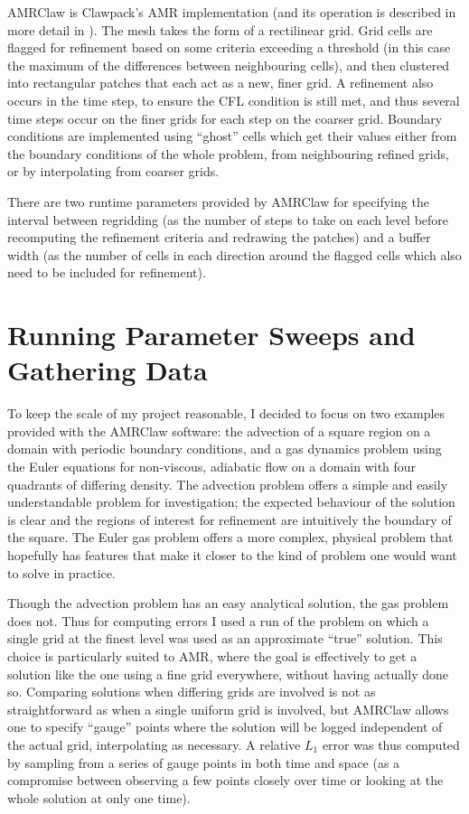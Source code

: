 \documentclass[11pt]{article}
\begin{document}
AMRClaw is Clawpack's AMR implementation (and its operation is described
in more detail in \cite{BergerLeVeque98}). The mesh takes the form of a 
rectilinear grid. Grid cells are flagged for refinement based on some criteria
exceeding a threshold (in this case the maximum of the differences between
neighbouring cells), and then clustered into rectangular patches that each
act as a new, finer grid. A refinement also occurs in the time step, to
ensure the CFL condition is still met, and thus several time steps occur
on the finer grids for each step on the coarser grid. Boundary conditions
are implemented using ``ghost'' cells which get their values either from
the boundary conditions of the whole problem, from neighbouring refined grids, 
or by interpolating from coarser grids.

There are two runtime parameters provided by AMRClaw for specifying the
interval between regridding (as the number of steps to take on each
level before recomputing the refinement criteria and redrawing the patches)
and a buffer width (as the number of cells in each direction around the
flagged cells which also need to be included for refinement).

\section*{Running Parameter Sweeps and Gathering Data}
To keep the scale of my project reasonable, I decided to focus on two examples
provided with the AMRClaw software: the advection of a square region on a domain
with periodic boundary conditions, and a gas dynamics problem using the Euler
equations for non-viscous, adiabatic flow on a domain with four quadrants of
differing density. The advection problem offers a simple and easily understandable
problem for investigation; the expected behaviour of the solution is clear and
the regions of interest for refinement are intuitively the boundary of the square.
The Euler gas problem offers a more complex, physical problem that hopefully has
features that make it closer to the kind of problem one would want to solve
in practice.

Though the advection problem has an easy analytical solution, the gas problem
does not. Thus for computing errors I used a run of the problem on which a 
single grid at the finest level was used as an approximate ``true'' solution.
This choice is particularly suited to AMR, where the goal is effectively to
get a solution like the one using a fine grid everywhere, without having 
actually done so. Comparing solutions when differing grids are involved is not
as straightforward as when a single uniform grid is involved, but AMRClaw 
allows one to specify ``gauge'' points where the solution will be logged
independent of the actual grid, interpolating as necessary.
A relative $L_1$ error was thus computed by sampling from a series of gauge
points in both time and space (as a compromise between observing a few points
closely over time or looking at the whole solution at only one time).
\end{document}
